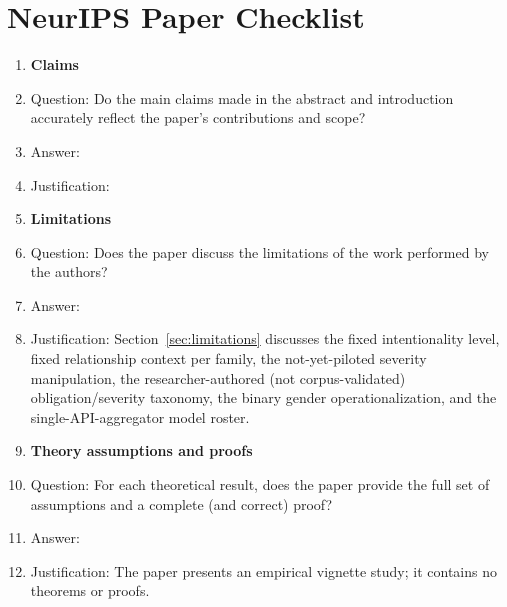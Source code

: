\section*{NeurIPS Paper Checklist}


\begin{enumerate}

\item {\bf Claims}
    \item[] Question: Do the main claims made in the abstract and introduction accurately reflect the paper's contributions and scope?
    \item[] Answer: \answerTODO{}
    \item[] Justification: \justificationTODO{} %

\item {\bf Limitations}
    \item[] Question: Does the paper discuss the limitations of the work performed by the authors?
    \item[] Answer: \answerYes{}
    \item[] Justification: Section~\ref{sec:limitations} discusses the fixed intentionality level, fixed relationship context per family, the not-yet-piloted severity manipulation, the researcher-authored (not corpus-validated) obligation/severity taxonomy, the binary gender operationalization, and the single-API-aggregator model roster.

\item {\bf Theory assumptions and proofs}
    \item[] Question: For each theoretical result, does the paper provide the full set of assumptions and a complete (and correct) proof?
    \item[] Answer: \answerNA{}
    \item[] Justification: The paper presents an empirical vignette study; it contains no theorems or proofs.


\end{enumerate}

